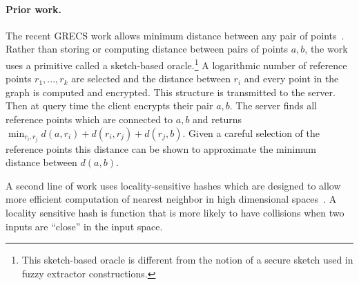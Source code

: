 \paragraph{Prior work.}
The recent GRECS work allows minimum distance between any pair of
points~\cite{CCS:MKNK15}.  Rather than storing or computing distance
between pairs of points $a,b$, the work uses a primitive called a
sketch-based oracle.\footnote{This sketch-based oracle is different from
the notion of a secure sketch used in fuzzy extractor constructions.}  A logarithmic number of reference points $r_1,..., r_k$ are selected and the distance between $r_i$ and every point in the graph is computed and encrypted.  This structure is transmitted to the server.  Then at query time the client encrypts their pair $a,b$.  The server finds all reference points which are connected to $a,b$ and returns $\min_{r_i, r_j} d(a,r_i) + d(r_i, r_j) + d(r_j, b)$.  Given a careful selection of the reference points this distance can be shown to approximate the minimum distance between $d(a,b)$.

A second line of work uses locality-sensitive hashes which are designed to allow more efficient computation of nearest neighbor in high dimensional spaces~\cite{datar2004locality,slaney2008locality}.  A locality sensitive hash is function that is more likely to have collisions when two inputs are ``close'' in the input space.

